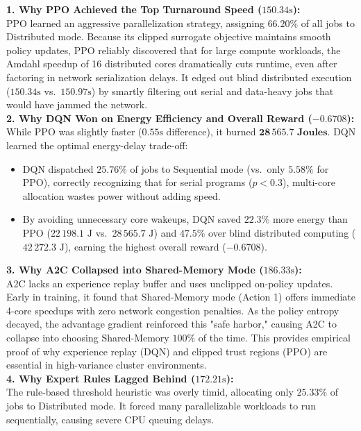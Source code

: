 \documentclass[11pt,a4paper]{article}
\begin{document}
\begin{tcolorbox}[insightbox, title=In-Depth Comparative Analysis: Why the Models Behaved Differently]
\textbf{1. Why PPO Achieved the Top Turnaround Speed ($150.34\text{s}$):}\\
PPO learned an aggressive parallelization strategy, assigning $\mathbf{66.20\%}$ of all jobs to Distributed mode. Because its clipped surrogate objective maintains smooth policy updates, PPO reliably discovered that for large compute workloads, the Amdahl speedup of 16 distributed cores dramatically cuts runtime, even after factoring in network serialization delays. It edged out blind distributed execution ($150.34\text{s}$ vs.\ $150.97\text{s}$) by smartly filtering out serial and data-heavy jobs that would have jammed the network.\\

\textbf{2. Why DQN Won on Energy Efficiency and Overall Reward ($-0.6708$):}\\
While PPO was slightly faster ($0.55\text{s}$ difference), it burned $\mathbf{28\,565.7\text{ Joules}}$. DQN learned the optimal energy-delay trade-off:
\begin{itemize}[noitemsep, topsep=1pt]
    \item DQN dispatched $\mathbf{25.76\%}$ of jobs to Sequential mode (vs.\ only $5.58\%$ for PPO), correctly recognizing that for serial programs ($p < 0.3$), multi-core allocation wastes power without adding speed.
    \item By avoiding unnecessary core wakeups, DQN saved $\mathbf{22.3\%}$ more energy than PPO ($22\,198.1\text{ J}$ vs.\ $28\,565.7\text{ J}$) and $\mathbf{47.5\%}$ over blind distributed computing ($42\,272.3\text{ J}$), earning the highest overall reward ($-0.6708$).
\end{itemize}

\textbf{3. Why A2C Collapsed into Shared-Memory Mode ($186.33\text{s}$):}\\
A2C lacks an experience replay buffer and uses unclipped on-policy updates. Early in training, it found that Shared-Memory mode (Action 1) offers immediate 4-core speedups with zero network congestion penalties. As the policy entropy decayed, the advantage gradient reinforced this "safe harbor," causing A2C to collapse into choosing Shared-Memory $100\%$ of the time. This provides empirical proof of why experience replay (DQN) and clipped trust regions (PPO) are essential in high-variance cluster environments.\\

\textbf{4. Why Expert Rules Lagged Behind ($172.21\text{s}$):}\\
The rule-based threshold heuristic was overly timid, allocating only $25.33\%$ of jobs to Distributed mode. It forced many parallelizable workloads to run sequentially, causing severe CPU queuing delays.
\end{tcolorbox}
\end{document}
